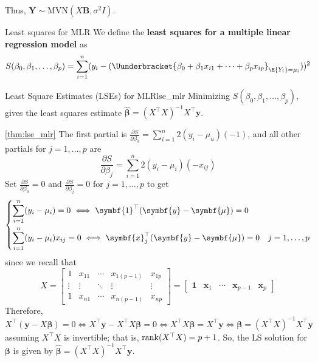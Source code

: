 Thus, $ \symbf{Y}\sim \text{MVN}(X\symbf{B},\sigma^2 I) $.
\begin{Definition}{Least squares for MLR}{}
  We define the \textbf{least squares for a multiple linear regression model}
  as
  \[ S(\beta_0,\beta_1,\ldots,\beta_p)
    =\sum\limits_{i=1}^{n}
    (y_i-(\Uunderbracket{
      \beta_0+\beta_1 x_{i1}+\cdots+\beta_p x_{ip}
    }_{\E{Y_i}=\mu_i}))^2
  \]
\end{Definition}
\begin{Theorem}{Least Square Estimates (LSEs) for MLR}{lse_mlr}
  Minimizing $ S(\beta_0,\beta_1,\ldots,\beta_p) $, gives the least squares
  estimate $ \hat{\symbf{\beta}}=(X^\top X)^{-1}X^\top\symbf{y} $.
\end{Theorem}
\begin{Proof}{\ref{thm:lse_mlr}}{}
  The first partial is $ \frac{\partial S}{\partial \beta_0}=\sum\limits_{i=1}^{n} 2(y_i-\mu_u)(-1) $,
  and all other partials for $ j=1,\ldots,p $ are
  \[ \dfrac{\partial S}{\partial \beta_j}=
    \sum\limits_{i=1}^{n} 2(y_i-\mu_i)(-x_{i j}) \]
  Set $ \displaystyle \frac{\partial S}{\partial \beta_0}=0 $
  and $ \displaystyle \frac{\partial S}{\partial \beta_j}=0 $ for $ j=1,\ldots,p $
  to get
  \[ \begin{dcases}
      \sum\limits_{i=1}^{n} (y_i-\mu_i)=0\iff \symbf{1}^\top(\symbf{y}-\symbf{\mu})=0 \\
      \sum\limits_{i=1}^{n} (y_i-\mu_i)x_{i j}=0\iff \symbf{x}_{j}^\top
      (\symbf{y}-\symbf{\mu})=0 & j=1,\ldots,p
    \end{dcases} \]
  since we recall that
  \[ X=\begin{bmatrix}
      1      & x_{11} & \cdots & x_{1(p-1)} & x_{1p}  \\
      \vdots & \vdots & \ddots & \vdots     & \vdots  \\
      1      & x_{n1} & \cdots & x_{n(p-1)} & x_{n p}
    \end{bmatrix}=
    \begin{bmatrix}
      \symbf{1} & \symbf{x}_1 & \cdots & \symbf{x}_{p-1} & \symbf{x}_p
    \end{bmatrix} \]
  Therefore,
  \[ X^\top(\symbf{y}-X\symbf{\beta})=0\iff
    X^\top \symbf{y}-X^\top X\symbf{\beta}=0\iff
    X^\top X \symbf{\beta}=X^\top \symbf{y}\iff
    \symbf{\beta}=(X^\top X)^{-1}X^\top \symbf{y} \]
  assuming $ X^\top X $ is invertible; that is,
  $ \operatorname{rank}(X^\top X)=p+1 $. So, the LS solution for $ \symbf{\beta} $ is given by
  $ \hat{\symbf{\beta}}=(X^\top X)^{-1}X^\top \symbf{y} $.
\end{Proof}
